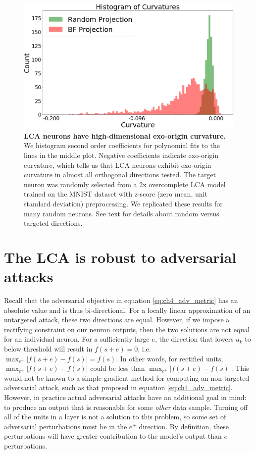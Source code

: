 \begin{figure}\label{fig:ch4_iso_contour_lca_hists}
    \begin{center}
    \centerline{\includegraphics[width=\textwidth]{figures/iso_contour_lca_hists.png}}
    \end{center}
    \caption{\textbf{LCA neurons have high-dimensional exo-origin curvature.} We histogram second order coefficients for polynomial fits to the lines in the middle plot. Negative coefficients indicate exo-origin curvature, which tells us that LCA neurons exhibit exo-origin curvature in almost all orthogonal directions tested. The target neuron was randomly selected from a 2x overcomplete LCA model trained on the MNIST dataset with z-score (zero mean, unit standard deviation) preprocessing. We replicated these results for many random neurons. See text for details about random versus targeted directions.}
\end{figure}


\section{The LCA is robust to adversarial attacks}
Recall that the adversarial objective in equation \eqref{eq:ch4_adv_metric} has an absolute value and is thus bi-directional. For a locally linear approximation of an untargeted attack, these two directions are equal. However, if we impose a rectifying constraint on our neuron outputs, then the two solutions are not equal for an individual neuron. For a sufficiently large $e$, the direction that lowers $a_{k}$ to below threshold will result in $f(s+e)=0$, i.e. $\max_{e^{-}}|f(s+e)-f(s)| = f(s)$. In other words, for rectified units, $\max_{e^{-}}|f(s+e)-f(s)|$ could be less than $\max_{e^{+}}|f(s+e)-f(s)|$. This would not be known to a simple gradient method for computing an non-targeted adversarial attack, such as that proposed in equation \eqref{eq:ch4_adv_metric}. However, in practice actual adversarial attacks have an additional goal in mind: to produce an output that is reasonable for some \emph{other} data sample. Turning off all of the units in a layer is not a solution to this problem, so some set of adversarial perturbations must be in the $e^{+}$ direction. By definition, these perturbations will have greater contribution to the model's output than $e^{-}$ perturbations.

